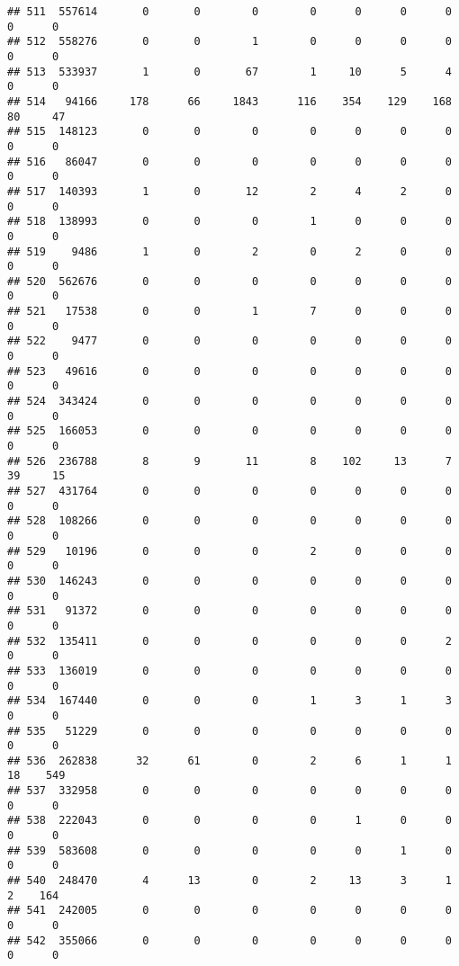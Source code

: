 \documentclass[
]{article}
\begin{document}
\begin{verbatim}
## 511  557614       0       0        0        0      0      0      0     0      0
## 512  558276       0       0        1        0      0      0      0     0      0
## 513  533937       1       0       67        1     10      5      4     0      0
## 514   94166     178      66     1843      116    354    129    168    80     47
## 515  148123       0       0        0        0      0      0      0     0      0
## 516   86047       0       0        0        0      0      0      0     0      0
## 517  140393       1       0       12        2      4      2      0     0      0
## 518  138993       0       0        0        1      0      0      0     0      0
## 519    9486       1       0        2        0      2      0      0     0      0
## 520  562676       0       0        0        0      0      0      0     0      0
## 521   17538       0       0        1        7      0      0      0     0      0
## 522    9477       0       0        0        0      0      0      0     0      0
## 523   49616       0       0        0        0      0      0      0     0      0
## 524  343424       0       0        0        0      0      0      0     0      0
## 525  166053       0       0        0        0      0      0      0     0      0
## 526  236788       8       9       11        8    102     13      7    39     15
## 527  431764       0       0        0        0      0      0      0     0      0
## 528  108266       0       0        0        0      0      0      0     0      0
## 529   10196       0       0        0        2      0      0      0     0      0
## 530  146243       0       0        0        0      0      0      0     0      0
## 531   91372       0       0        0        0      0      0      0     0      0
## 532  135411       0       0        0        0      0      0      2     0      0
## 533  136019       0       0        0        0      0      0      0     0      0
## 534  167440       0       0        0        1      3      1      3     0      0
## 535   51229       0       0        0        0      0      0      0     0      0
## 536  262838      32      61        0        2      6      1      1    18    549
## 537  332958       0       0        0        0      0      0      0     0      0
## 538  222043       0       0        0        0      1      0      0     0      0
## 539  583608       0       0        0        0      0      1      0     0      0
## 540  248470       4      13        0        2     13      3      1     2    164
## 541  242005       0       0        0        0      0      0      0     0      0
## 542  355066       0       0        0        0      0      0      0     0      0

\end{verbatim}
\end{document}

